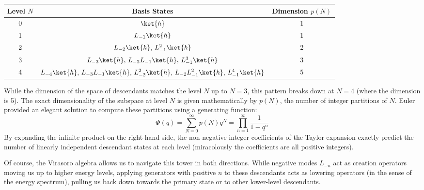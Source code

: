 \begin{table}[H]
    \centering
    \begin{tabular}{ccc}
        \toprule
        \textbf{Level} \(N\) & \textbf{Basis States}                                                                                       & \textbf{Dimension} \(p(N)\) \\
        \midrule
        0                    & \(\ket{h}\)                                                                                                 & 1                           \\
        1                    & \(L_{-1}\ket{h}\)                                                                                           & 1                           \\
        2                    & \(L_{-2}\ket{h}, \, L_{-1}^2\ket{h}\)                                                                       & 2                           \\
        3                    & \(L_{-3}\ket{h}, \, L_{-2}L_{-1}\ket{h}, \, L_{-1}^3\ket{h}\)                                               & 3                           \\
        4                    & \(L_{-4}\ket{h}, \, L_{-3}L_{-1}\ket{h}, \, L_{-2}^2\ket{h}, \, L_{-2}L_{-1}^2\ket{h}, \, L_{-1}^4\ket{h}\) & 5                           \\
        \bottomrule
    \end{tabular}
    \label{tab:verma_modules}
\end{table}

While the dimension of the space of descendants matches the level \(N\) up to \(N=3\), this pattern breaks down at \(N=4\) (where the dimension is 5). The exact dimensionality of the subspace at level \(N\) is given mathematically by \(p(N)\), the number of integer partitions of \(N\). Euler provided an elegant solution to compute these partitions using a generating function:
\[
    \Phi(q) = \sum_{N=0}^{\infty} p(N) q^N = \prod_{n=1}^{\infty} \frac{1}{1-q^n}
\]
By expanding the infinite product on the right-hand side, the non-negative integer coefficients of the Taylor expansion exactly predict the number of linearly independent descendant states at each level (miracolously the coefficients are all positive integers).

Of course, the Virasoro algebra allows us to navigate this tower in both directions. While negative modes \(L_{-n}\) act as creation operators moving us up to higher energy levels, applying generators with positive \(n\) to these descendants acts as lowering operators (in the sense of the energy spectrum), pulling us back down towards the primary state or to other lower-level descendants.

